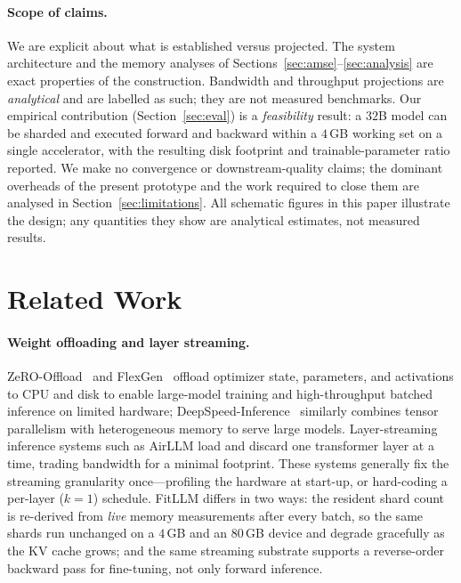 \documentclass{article}
\begin{document}
\paragraph{Scope of claims.} We are explicit about what is established versus
projected. The system architecture and the memory analyses of
Sections~\ref{sec:amse}--\ref{sec:analysis} are exact properties of the
construction. Bandwidth and throughput projections are \emph{analytical} and are
labelled as such; they are not measured benchmarks. Our empirical contribution
(Section~\ref{sec:eval}) is a \emph{feasibility} result: a $32$B model can be
sharded and executed forward and backward within a $4$\,GB working set on a
single accelerator, with the resulting disk footprint and trainable-parameter
ratio reported. We make no convergence or downstream-quality claims; the
dominant overheads of the present prototype and the work required to close them
are analysed in Section~\ref{sec:limitations}. All schematic figures in this
paper illustrate the design; any quantities they show are analytical estimates,
not measured results.

\section{Related Work}
\label{sec:related}

\paragraph{Weight offloading and layer streaming.}
ZeRO-Offload~\citep{ren2021zerooffload} and FlexGen~\citep{sheng2023flexgen}
offload optimizer state, parameters, and activations to CPU and disk to enable
large-model training and high-throughput batched inference on limited hardware;
DeepSpeed-Inference~\citep{aminabadi2022deepspeed} similarly combines tensor
parallelism with heterogeneous memory to serve large models. Layer-streaming
inference systems such as AirLLM load and discard one transformer layer at a
time, trading bandwidth for a minimal footprint. These systems generally fix the
streaming granularity once---profiling the hardware at start-up, or hard-coding a
per-layer ($k\!=\!1$) schedule. FitLLM differs in two ways: the resident shard
count is re-derived from \emph{live} memory measurements after every batch, so
the same shards run unchanged on a $4$\,GB and an $80$\,GB device and degrade
gracefully as the KV cache grows; and the same streaming substrate supports a
reverse-order backward pass for fine-tuning, not only forward inference.
\end{document}
